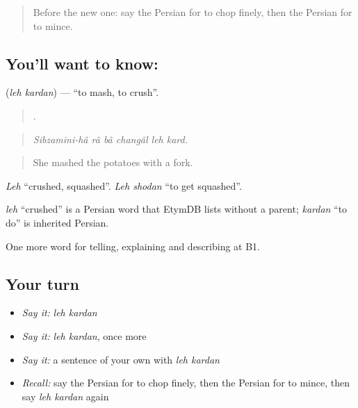 \label{lesson:FA-C356-leh-kardan}



\begin{quote}
Before the new one: say the Persian for to chop finely, then the Persian for to mince.
\end{quote}

\subsection*{You'll want to know:  }
\textbf{ } (\emph{leh kardan}) — \textquotedblleft{}to mash, to crush\textquotedblright{}.

\begin{quote}
       .
\end{quote}

\begin{quote}
\emph{Sibzamini-hâ râ bâ changâl leh kard.}
\end{quote}

\begin{quote}
She mashed the potatoes with a fork.
\end{quote}

\emph{Leh} \textquotedblleft{}crushed, squashed\textquotedblright{}. \emph{Leh shodan} \textquotedblleft{}to get squashed\textquotedblright{}.

\begin{cousinweb}
\emph{leh} \textquotedblleft{}crushed\textquotedblright{} is a Persian word that EtymDB lists without a parent; \emph{kardan} \textquotedblleft{}to do\textquotedblright{} is inherited Persian.
\end{cousinweb}

\begin{grammarlens}[title={What you've built}]
One more word for telling, explaining and describing at B1.
\end{grammarlens}

\subsection*{Your turn}
\begin{itemize}
\raggedright
  \item \emph{Say it:} \emph{leh kardan}
  \item \emph{Say it:} \emph{leh kardan}, once more
  \item \emph{Say it:} a sentence of your own with \emph{leh kardan}
  \item \emph{Recall:} say the Persian for to chop finely, then the Persian for to mince, then say \emph{leh kardan} again
\end{itemize}


